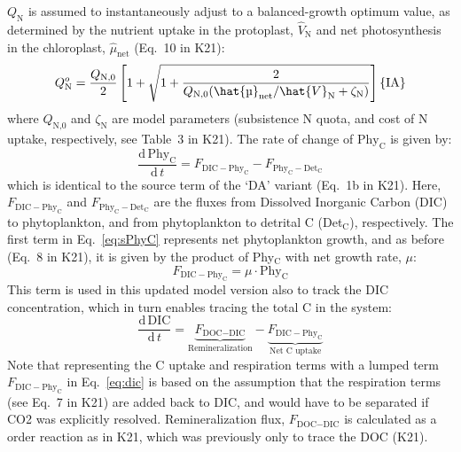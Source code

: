 \documentclass[gmd, manuscript]{copernicus}
\begin{document}
$Q_{\text{N}}$ is assumed to instantaneously adjust to a balanced-growth optimum value, as determined by the nutrient uptake in the protoplast, $\hat{V}_{\text{N}}$ and net photosynthesis in the chloroplast, $\hat{\mu}_{\text{net}}$ (Eq.~10 in K21):
\begin{equation}\label{eq:Qopt}
 Q_{\text{N}}^o= \frac{Q_{\text{N,0}}}{2} \left[1+\sqrt{1+\frac{2}{Q_{\text{N,0}}{({\hat{\mu}_{\text{net}}}/{\hat{V}_{\text{N}}}+\zeta_{\text{N}} )}}} \right] \hfill \{\text{IA}\}
\end{equation}
where $Q_{\text{N,0}}$ and $\zeta_{\text{N}}$ are model parameters (subsistence N quota, and cost of N uptake, respectively, see Table~3 in K21). The rate of change of $\text{Phy}_{\text{C}}$ is given by:
\begin{equation} \label{eq:sPhyC}
\frac{\mathrm{d}\, \text{Phy}_{\text{C}}}{\mathrm{d}\, t} = F_{\text{DIC}-\text{Phy}_{\text{C}}} - F_{\text{Phy}_{\text{C}}-\text{Det}_{\text{C}}}
\end{equation}
which is identical to the source term of the `DA' variant (Eq.~1b in K21). Here, $F_{\text{DIC}-\text{Phy}_{\text{C}}}$ and $F_{\text{Phy}_{\text{C}}-\text{Det}_{\text{C}}}$ are the fluxes from Dissolved Inorganic Carbon (DIC) to phytoplankton, and from phytoplankton to detrital C (Det$_{\text{C}}$), respectively. The first term in Eq.~\eqref{eq:sPhyC} represents net phytoplankton growth, and as before (Eq.~8 in K21), it is given by the product of Phy$_{\text{C}}$ with net growth rate, $\mu$: 
\begin{equation} \label{eq:fdicphyc}
 F_{\text{DIC}-\text{Phy}_{\text{C}}} = \mu \cdot \text{Phy}_{\text{C}}
\end{equation}
This term is used in this updated model version also to track the DIC concentration, which in turn enables tracing the total C in the system:
\begin{equation} \label{eq:dic}
  \frac{\mathrm{d}\, \text{DIC}}{\mathrm{d}\, t} = \underbrace{F_{\text{DOC}-\text{DIC}}}_{\textrm{Remineralization}} - \underbrace{F_{\text{DIC}-\text{Phy}_{\text{C}}}}_{\textrm{Net C uptake}}
\end{equation}
Note that representing the C uptake and respiration terms with a lumped term $F_{\text{DIC}-\text{Phy}_{\text{C}}}$ in Eq.~\eqref{eq:dic} is based on the assumption that the respiration terms (see Eq.~7 in K21) are added back to DIC, and would have to be separated if CO2 was explicitly resolved. Remineralization flux, $F_{\text{DOC}-\text{DIC}}$ is calculated as a order reaction as in K21, which was previously only to trace the DOC (K21).
\end{document}
